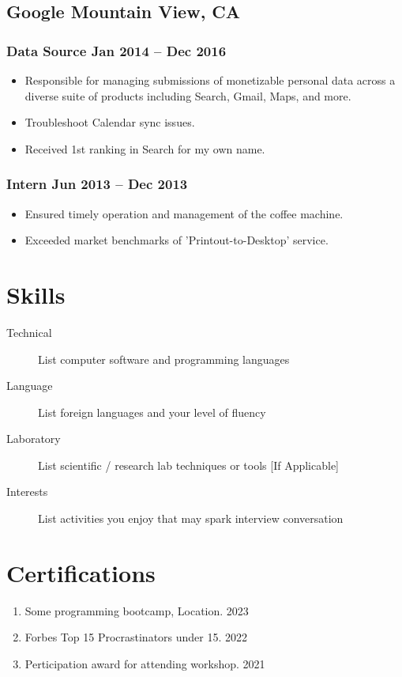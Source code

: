 \documentclass[11pt]{article}
\newcommand{\rside}[1]{
  \hfill {\normalfont\color{accent} #1}%
}
\begin{document}
\subsection{Google \rside{Mountain View, CA}}
\subsubsection{Data Source \rside{Jan 2014 -- Dec 2016}}
\begin{itemize}
  \item Responsible for managing submissions of monetizable personal data across a diverse suite of products including Search, Gmail, Maps, and more. 
  \item Troubleshoot Calendar sync issues. 
  \item Received 1st ranking in Search for my own name.
\end{itemize}

\subsubsection{Intern \rside{Jun 2013 -- Dec 2013}}
\begin{itemize}
  \item Ensured timely operation and management of the coffee machine.
  \item Exceeded market benchmarks of 'Printout-to-Desktop' service.
\end{itemize}


\section{Skills}
\begin{description}
  \item[Technical] List computer software and programming languages 
  \item[Language] List foreign languages and your level of fluency
  \item[Laboratory] List scientific / research lab techniques or tools [If Applicable]
  \item[Interests] List activities you enjoy that may spark interview conversation
\end{description}


\section{Certifications}
\begin{enumerate}[label=\null, left=0pt..0pt, itemsep=0pt]
  \item Some programming bootcamp, Location. \rside{2023}
  \item Forbes Top 15 Procrastinators under 15. \rside{2022}
  \item Perticipation award for attending workshop. \rside{2021}
\end{enumerate}
\end{document}
